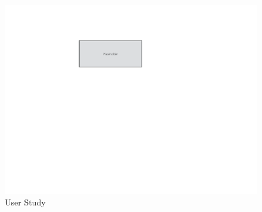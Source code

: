 \begin{figure}[t]
 \centering
 \includegraphics[width=\columnwidth]{figs/placeholder}
\caption{User Study}
\label{fig:userstudy}
\end{figure}

